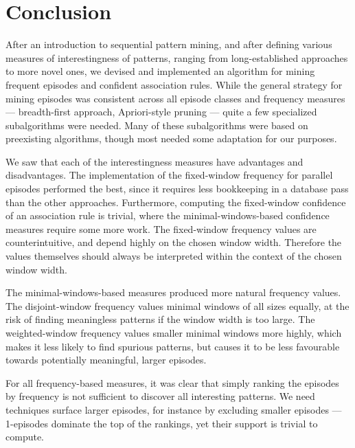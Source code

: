 \chapter{Conclusion}


After an introduction to sequential pattern mining, and after defining various measures of interestingness of patterns, ranging from long-established approaches to more novel ones, we devised and implemented an algorithm for mining frequent episodes and confident association rules. While the general strategy for mining episodes was consistent across all episode classes and frequency measures --- breadth-first approach, Apriori-style pruning --- quite a few specialized subalgorithms were needed. Many of these subalgorithms were based on preexisting algorithms, though most needed some adaptation for our purposes.


We saw that each of the interestingness measures have advantages and disadvantages. The implementation of the fixed-window frequency for parallel episodes performed the best, since it requires less bookkeeping in a database pass than the other approaches. Furthermore, computing the fixed-window confidence of an association rule is trivial, where the minimal-windows-based confidence measures require some more work. The fixed-window frequency values are counterintuitive, and depend highly on the chosen window width. Therefore the values themselves should always be interpreted within the context of the chosen window width.

The minimal-windows-based measures produced more natural frequency values. The disjoint-window frequency values minimal windows of all sizes equally, at the risk of finding meaningless patterns if the window width is too large. The weighted-window frequency values smaller minimal windows more highly, which makes it less likely to find spurious patterns, but causes it to be less favourable towards potentially meaningful, larger episodes.

For all frequency-based measures, it was clear that simply ranking the episodes by frequency is not sufficient to discover all interesting patterns. We need techniques surface larger episodes, for instance by excluding smaller episodes --- 1-episodes dominate the top of the rankings, yet their support is trivial to compute.

